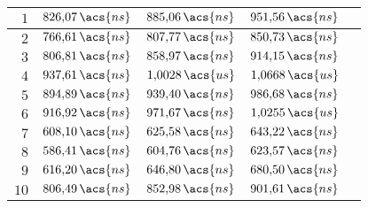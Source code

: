 \begin{longtable}[t]{|r|c|c|c|c|}
    $1$                             & $826{,}07\,\acs{ns}$                            & $ 885{,}06\,\acs{ns}$ & $ 951{,}56\,\acs{ns}$ \\ \hline
    $2$                             & $766{,}61\,\acs{ns}$                            & $ 807{,}77\,\acs{ns}$ & $ 850{,}73\,\acs{ns}$ \\ \hline
    $3$                             & $806{,}81\,\acs{ns}$                            & $ 858{,}97\,\acs{ns}$ & $ 914{,}15\,\acs{ns}$ \\ \hline
    $4$                             & $937{,}61\,\acs{ns}$                            & $ 1{,}0028\,\acs{us}$ & $ 1{,}0668\,\acs{us}$ \\ \hline
    $5$                             & $894{,}89\,\acs{ns}$                            & $ 939{,}40\,\acs{ns}$ & $ 986{,}68\,\acs{ns}$ \\ \hline
    $6$                             & $916{,}92\,\acs{ns}$                            & $ 971{,}67\,\acs{ns}$ & $ 1{,}0255\,\acs{us}$ \\ \hline
    $7$                             & $608{,}10\,\acs{ns}$                            & $ 625{,}58\,\acs{ns}$ & $ 643{,}22\,\acs{ns}$ \\ \hline
    $8$                             & $586{,}41\,\acs{ns}$                            & $ 604{,}76\,\acs{ns}$ & $ 623{,}57\,\acs{ns}$ \\ \hline
    $9$                             & $616{,}20\,\acs{ns}$                            & $ 646{,}80\,\acs{ns}$ & $ 680{,}50\,\acs{ns}$ \\ \hline
    $10$                            & $806{,}49\,\acs{ns}$                            & $ 852{,}98\,\acs{ns}$ & $ 901{,}61\,\acs{ns}$ \\ \hline
\end{longtable}
